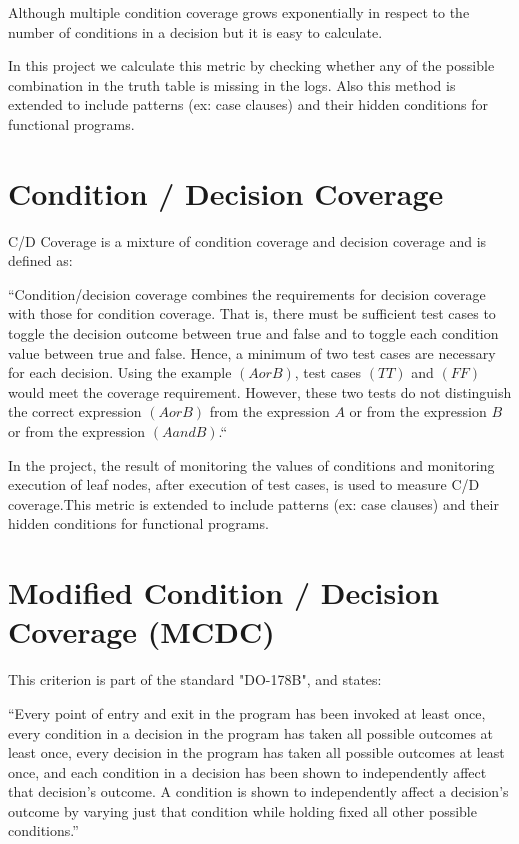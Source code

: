 \documentclass[12pt,a4paper]{report}
\begin{document}
Although multiple condition coverage grows exponentially in respect to the number of conditions in a decision but it is easy to calculate.

In this project we calculate this metric by checking whether any of the possible combination in the truth table is missing in the logs. Also this method is
 extended to include patterns (ex: case clauses) and their hidden conditions for functional programs.

\section{Condition / Decision Coverage}
C/D Coverage is a mixture of condition coverage and decision coverage and is defined as:

“Condition/decision coverage combines the requirements for decision coverage with those for condition coverage. That is, there must be sufficient test cases
 to toggle the decision outcome between true and false and to toggle each condition value between true and false. Hence, a minimum of two test cases are
 necessary for each decision. Using the example $(A or B)$, test cases $(TT)$ and $(FF)$ would meet the coverage requirement. However, these two tests do
 not distinguish the correct expression $(A or B)$ from the expression $A$ or from the expression $B$ or from the expression $(A and B)$.“
\cite{KellyJ.:2001:PTM:886632} 

In the project, the result of monitoring the values of conditions and monitoring execution of leaf nodes, after execution of test cases, is used to
 measure C/D coverage.This metric is extended to include patterns (ex: case clauses) and their hidden conditions for functional programs.

\section{Modified Condition / Decision Coverage (MCDC)}
This criterion is part of the standard "DO-178B", and states:

“Every point of entry and exit in the program has been invoked at least once, every condition in a decision in the program has taken all possible outcomes
 at least once, every decision in the program has taken all possible outcomes at least once, and each condition in a decision has been shown to
 independently affect that decision's outcome. A condition is shown to independently affect a decision's outcome by varying just that condition while
 holding fixed all other possible conditions.”\cite{cast-10}
\end{document}
